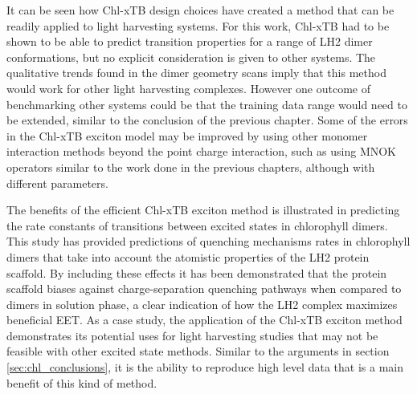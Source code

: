 It can be seen how Chl-xTB design choices have created a method that can be readily 
applied to light harvesting systems. For this work, Chl-xTB had to be shown to be 
able to predict transition properties for a range of LH2 dimer conformations, but 
no explicit consideration is given to other systems. The qualitative trends found 
in the dimer geometry scans imply that this method would work for other light harvesting
complexes. However one outcome of benchmarking other systems could be that the training
data range would need to be extended, similar to the conclusion of the previous 
chapter. Some of the errors in the Chl-xTB exciton model may be improved by using
other monomer interaction methods beyond the point charge interaction, such as
using MNOK operators similar to the work done in the previous chapters, although
with different parameters.

The benefits of the efficient Chl-xTB exciton method is illustrated in predicting
the rate constants of transitions between excited states in chlorophyll dimers. 
This study has provided  predictions of quenching mechanisms rates in chlorophyll
dimers that take into account the atomistic properties of the LH2 protein scaffold.
By including these effects it has been demonstrated that the protein scaffold biases 
against charge-separation quenching pathways when compared to dimers in solution
phase, a clear indication of how the LH2 complex maximizes beneficial EET. As a 
case study, the application of the Chl-xTB exciton method demonstrates its potential
uses for light harvesting studies that may not be feasible with other excited state
methods. Similar to the arguments in section \ref{sec:chl_conclusions}, it is the 
ability to reproduce high level data that is a main benefit of this kind of method.
